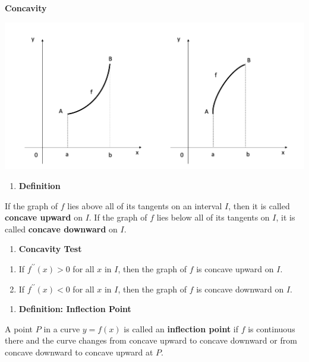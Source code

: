 \documentclass[]{book}
\providecommand{\tightlist}{%
  \setlength{\itemsep}{0pt}\setlength{\parskip}{0pt}}
\begin{document}
\textbf{Concavity}

\begin{center}\includegraphics[width=1\linewidth]{figure/5Derivatives-15} \end{center}

\begin{enumerate}
\def\labelenumi{\arabic{enumi}.}
\setcounter{enumi}{2}
\tightlist
\item
  \textbf{Definition}
\end{enumerate}

If the graph of \(f\) lies above all of its tangents on an interval \(I\), then it is called \textbf{concave upward} on \(I\). If the graph of \(f\) lies below all of its tangents on \(I\), it is called \textbf{concave downward} on \(I\).

\begin{enumerate}
\def\labelenumi{\arabic{enumi}.}
\setcounter{enumi}{3}
\tightlist
\item
  \textbf{Concavity Test}
\end{enumerate}

\begin{enumerate}
\def\labelenumi{(\alph{enumi})}
\tightlist
\item
  If \(f^{\prime \prime}(x)>0\) for all \(x\) in \(I\), then the graph of \(f\) is concave upward on \(I\).
\item
  If \(f^{\prime \prime}(x)<0\) for all \(x\) in \(I\), then the graph of \(f\) is concave downward on \(I\).
\end{enumerate}

\begin{enumerate}
\def\labelenumi{\arabic{enumi}.}
\setcounter{enumi}{4}
\tightlist
\item
  \textbf{Definition: Inflection Point}
\end{enumerate}

A point \(P\) in a curve \(y=f(x)\) is called an \textbf{inflection point} if \(f\) is continuous there and the curve changes from concave upward to concave downward or from concave downward to concave upward at \(P\).
\end{document}
